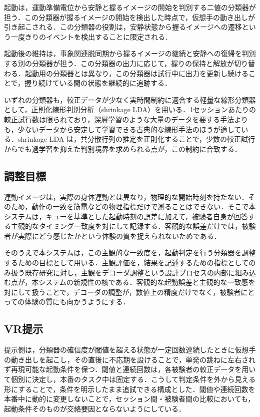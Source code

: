 \documentclass[twoside]{wiss}
\begin{document}
起動は，運動準備電位から安静と握るイメージの開始を判別する二値の分類器が担う．この分類器が握るイメージの開始を検出した時点で，仮想手の動き出しが引き起こされる．この分類器の役割は，安静状態から握るイメージへの遷移という一度きりのイベントを検出することに限定される．

起動後の維持は，事象関連脱同期から握るイメージの継続と安静への復帰を判別する別の分類器が担う．この分類器の出力に応じて，握りの保持と解放が切り替わる．起動用の分類器とは異なり，この分類器は試行中に出力を更新し続けることで，握り続けている間の状態を継続的に追跡する．

いずれの分類器も，較正データが少なく実時間制約に適合する軽量な線形分類器として，正則化線形判別分析（shrinkage LDA）を用いる．1セッションあたりの較正試行数は限られており，深層学習のような大量のデータを要する手法よりも，少ないデータから安定して学習できる古典的な線形手法のほうが適している．shrinkage LDA は，共分散行列の推定を正則化することで，少数の較正試行からでも過学習を抑えた判別境界を求められる点が，この制約に合致する．

\subsection{調整目標}

運動イメージは，実際の身体運動とは異なり，物理的な開始時刻を持たない．そのため，動作の一致を筋電などの物理指標だけで測ることはできない．そこで本システムは，キューを基準とした起動時刻の誤差に加えて，被験者自身が回答する主観的なタイミング一致度を対にして記録する．客観的な誤差だけでは，被験者が実際にどう感じたかという体験の質を捉えられないためである．

そのうえで本システムは，この主観的な一致度を，起動判定を行う分類器を調整するための目標として用いる．主観評価を，結果を記述するための指標としてのみ扱う既存研究に対し，主観をデコーダ調整という設計プロセスの内部に組み込む点が，本システムの新規性の核である．客観的な起動誤差と主観的な一致感を対にして扱うことで，デコーダの調整が，数値上の精度だけでなく，被験者にとっての体験の質にも向かうようにする．

\subsection{VR提示}

提示側は，分類器の確信度が閾値を超える状態が一定回数連続したときに仮想手の動き出しを起こし，その直後に不応期を設けることで，単発の跳ねに左右されず再現可能な起動条件を保つ．閾値と連続回数は，各被験者の較正データを用いて個別に決定し，本番のタスク中は固定する．こうして判定条件を外から見える形にすることで，条件を明示したまま追試できる構成とした．閾値や連続回数を本番中に動的に変更しないことで，セッション間・被験者間の比較においても，起動条件そのものが交絡要因とならないようにしている．
\end{document}
